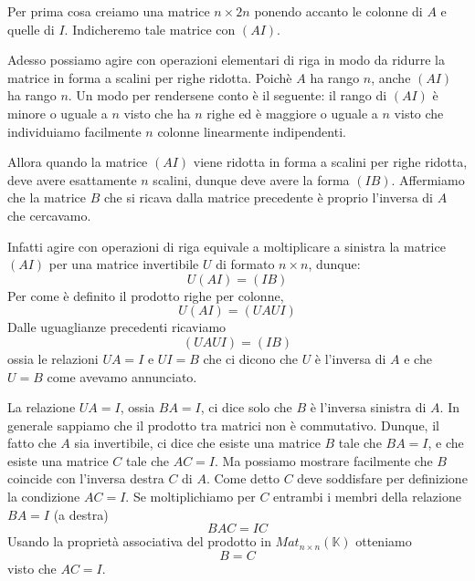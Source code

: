 Per prima cosa creiamo una matrice $n \times 2n$ ponendo accanto le colonne di $A$
e quelle di $I$. Indicheremo tale matrice con $(A I)$.

Adesso possiamo agire con operazioni elementari di riga in modo da ridurre la
matrice in forma a scalini per righe ridotta. Poich\`e $A$ ha rango $n$, anche
$(A I)$ ha rango $n$. Un modo per rendersene conto \`e il seguente: il rango di
$(A I)$ \`e minore o uguale a $n$ visto che ha $n$ righe ed \`e maggiore o uguale
a $n$ visto che individuiamo facilmente $n$ colonne linearmente indipendenti.

Allora quando la matrice $(A I)$ viene ridotta in forma a scalini per righe ridotta,
deve avere esattamente $n$ scalini, dunque deve avere la forma $(I B)$.
Affermiamo che la matrice $B$ che si ricava dalla matrice precedente \`e proprio
l'inversa di $A$ che cercavamo.

Infatti agire con operazioni di riga equivale a moltiplicare a sinistra la matrice
$(A I)$ per una matrice invertibile $U$ di formato $n \times n$, dunque:
\begin{equation*}
	U (A I) = (I B)
\end{equation*}
Per come \`e definito il prodotto righe per colonne,
\begin{equation*}
	U (A I) = (U A U I)
\end{equation*}
Dalle uguaglianze precedenti ricaviamo
\begin{equation*}
	(U A U I) = (I B)
\end{equation*}
ossia le relazioni $U A = I$ e $U I = B$ che ci dicono che $U$ \`e l'inversa di
$A$ e che $U = B$ come avevamo annunciato.

\begin{observation}
	La relazione $U A = I$, ossia $BA = I$, ci dice solo che $B$ \`e l'inversa
	sinistra di $A$. In generale sappiamo che il prodotto tra matrici non \`e
	commutativo. Dunque, il fatto che $A$ sia invertibile, ci dice che esiste una
	matrice $B$ tale che $BA = I$, e che esiste una matrice $C$ tale che $AC = I$.
	Ma possiamo mostrare facilmente che $B$ coincide con l'inversa destra $C$ di
	$A$. Come detto $C$ deve soddisfare per definizione la condizione $AC = I$.
	Se moltiplichiamo per $C$ entrambi i membri della relazione $BA = I$ (a destra)
	\[ BAC = IC \] Usando la propriet\`a associativa del prodotto in
	$Mat_{n \times n}(\mathbb{K})$ otteniamo \[B = C\] visto che $AC = I$.
\end{observation}

